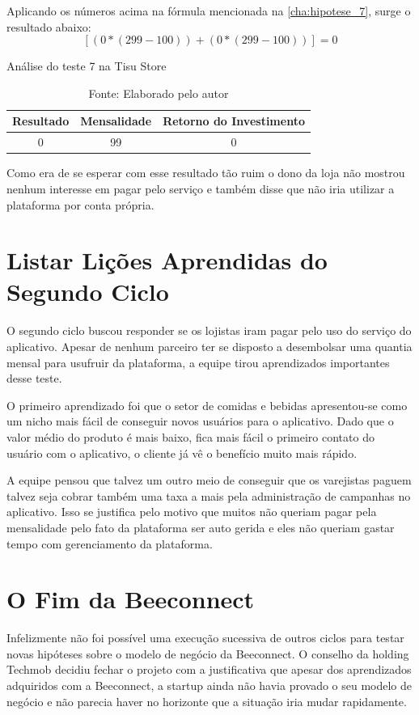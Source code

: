 Aplicando os números acima na fórmula mencionada na \autoref{cha:hipotese_7}, surge o resultado abaixo:
\[[(0 * (299 - 100)) + (0 * (299 - 100))] = 0\]

\begin{table}[H]
\centering
\caption{Análise do teste 7 na Tisu Store}
\label{tab:resultado_7_tisu_store_b}
\begin{tabular}{|c|c|c|}
\hline
Resultado & Mensalidade & Retorno do Investimento \\ \hline
0             & 99          &   0 \\ \hline
\end{tabular}
\caption* {Fonte: Elaborado pelo autor}    
\end{table}

Como era de se esperar com esse resultado tão ruim o dono da loja não mostrou nenhum interesse em pagar pelo serviço e também disse que não iria utilizar a plataforma por conta própria. 

\section{Listar Lições Aprendidas do Segundo Ciclo}
\label{cha:listar_licoes_aprendidas_segundo_ciclo}
O segundo ciclo buscou responder se os lojistas iram pagar pelo uso do serviço do aplicativo. Apesar de nenhum parceiro ter se disposto a desembolsar uma quantia mensal para usufruir da plataforma, a equipe tirou aprendizados importantes desse teste.

O primeiro aprendizado foi que o setor de comidas e bebidas apresentou-se como um nicho mais fácil de conseguir novos usuários para o aplicativo. Dado que o valor médio do produto é mais baixo, fica mais fácil o primeiro contato do usuário com o aplicativo, o cliente já vê o benefício muito mais rápido.

A equipe pensou que talvez um outro meio de conseguir que os varejistas paguem talvez seja cobrar também uma taxa a mais pela administração de campanhas no aplicativo. Isso se justifica pelo motivo que muitos não queriam pagar pela mensalidade pelo fato da plataforma ser auto gerida e eles não queriam gastar tempo com gerenciamento da plataforma.

\section{O Fim da Beeconnect}
\label{cha:fim_da_beeconnect}
Infelizmente não foi possível uma execução sucessiva de outros ciclos para testar novas hipóteses sobre o modelo de negócio da Beeconnect. O conselho da holding Techmob decidiu fechar o projeto com a justificativa que apesar dos aprendizados adquiridos com a Beeconnect, a startup ainda não havia provado o seu modelo de negócio e não parecia haver no horizonte que a situação iria mudar rapidamente.

